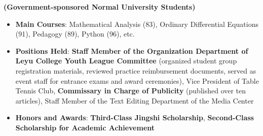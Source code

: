 	\centering
	\textbf{(Government-sponsored Normal University Students)}
	
	\begin{itemize}
		
		\item \textbf{Main Courses}: Mathematical Analysis (83),
		 Ordinary Differential Equations (91), Pedagogy (89), %
		 Python (96), etc.
		\item \textbf{Positions Held}: \textbf{Staff Member of the Organization Department of Leyu College Youth League Committee} (organized student group registration materials, reviewed practice reimbursement documents, served as event staff for entrance exams and award ceremonies), Vice President of Table Tennis Club, \textbf{Commissary in Charge of Publicity} (published over ten articles), Staff Member of the Text Editing Department of the Media Center
		\item \textbf{Honors and Awards}: \textbf{Third-Class Jingshi Scholarship}, \textbf{Second-Class Scholarship for Academic Achievement}
	\end{itemize}
	
	\vspace{0.5em}
	
	
